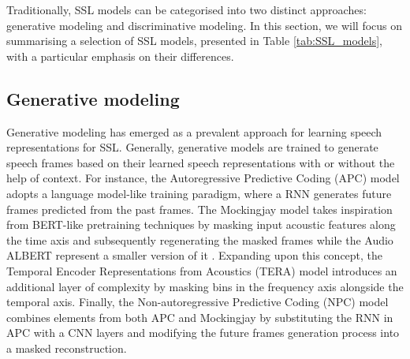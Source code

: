 Traditionally, \ac{SSL} models can be categorised into two distinct approaches: generative modeling and discriminative modeling. In this section, we will focus on summarising a selection of \ac{SSL} models, presented in Table \ref{tab:SSL_models}, with a particular emphasis on their differences.

\subsection{Generative modeling}
Generative modeling has emerged as a prevalent approach for learning speech representations for \ac{SSL}. Generally, generative models are trained to generate speech frames based on their learned speech representations with or without the help of context. For instance, the Autoregressive Predictive Coding (APC) model \cite{chung19_interspeech} adopts a language model-like training paradigm, where a \ac{RNN} generates future frames predicted from the past frames. 
The Mockingjay model \cite{mockingjay} takes inspiration from BERT-like pretraining techniques by masking input acoustic features along the time axis and subsequently regenerating the masked frames while the Audio ALBERT represent a smaller version of it \cite{chi2021audio}. Expanding upon this concept, the Temporal Encoder Representations from Acoustics (TERA) model \cite{liu2021tera} introduces an additional layer of complexity by masking bins in the frequency axis alongside the temporal axis. Finally, the Non-autoregressive Predictive Coding (NPC) model \cite{liu21l_interspeech} combines elements from both APC and Mockingjay by substituting the \ac{RNN} in APC with a \ac{CNN} layers and modifying the future frames generation process into a masked reconstruction.

